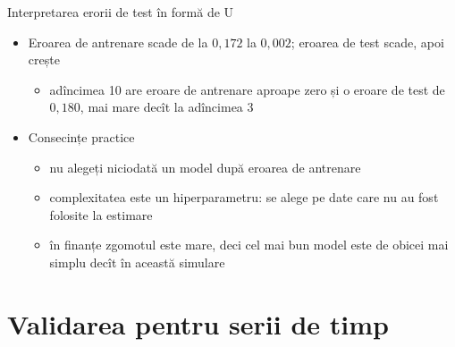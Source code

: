 \begin{frame}{Interpretarea erorii de test în formă de U}
\itemsize{\small}
\begin{itemize}
    \item Eroarea de antrenare scade de la $0{,}172$ la $0{,}002$; eroarea de test scade, apoi crește
    \begin{itemize}
        \item adîncimea 10 are eroare de antrenare aproape zero și o eroare de test de $0{,}180$, mai mare decît la adîncimea 3
    \end{itemize}
    \item Consecințe practice
    \begin{itemize}
        \item nu alegeți niciodată un model după eroarea de antrenare
        \item complexitatea este un hiperparametru: se alege pe date care nu au fost folosite la estimare
        \item în finanțe zgomotul este mare, deci cel mai bun model este de obicei mai simplu decît în această simulare
    \end{itemize}
\end{itemize}
\end{frame}


\section{Validarea pentru serii de timp}

